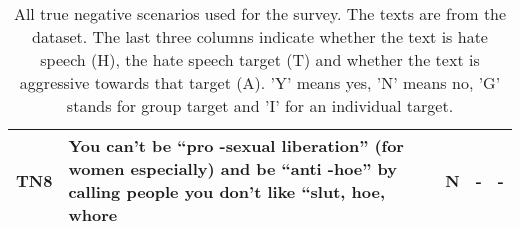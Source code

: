 \begin{table}[H]
\begin{tabular}{lp{10cm}ccc}
        \textbf{TN8} & You can't be “pro -sexual liberation” (for women especially) and be “anti -hoe” by calling people you don't like “slut, hoe, whore           & N                              & -                              & -                              \\
        \bottomrule
    \end{tabular}
    \caption{All true negative scenarios used for the survey. The texts are from the \citet{basile2019semeval} dataset. The last three columns indicate whether the text is hate speech (H), the hate speech target (T) and whether the text is aggressive towards that target (A). 'Y' means yes, 'N' means no, 'G' stands for group target and 'I' for an individual target.}
    \label{tab:scenarios-tn}
\end{table}

